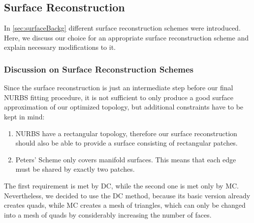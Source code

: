 \subsection{Surface Reconstruction}
\label{ssec:reconstruction}
In \autoref{sec:surfaceBackg} different surface reconstruction schemes were introduced. Here, we discuss our choice for an appropriate surface reconstruction scheme and explain necessary modifications to it.

\subsubsection{Discussion on Surface Reconstruction Schemes}
Since the surface reconstruction is just an intermediate step before our final \ac{NURBS} fitting procedure, it is not sufficient to only produce a good surface approximation of our optimized topology, but additional constraints have to be kept in mind:
\begin{enumerate}
\item \ac{NURBS} have a rectangular topology, therefore our surface reconstruction should also be able to provide a surface consisting of rectangular patches.
\item Peters' Scheme only covers manifold surfaces. This means that each edge must be shared by exactly two patches.
\end{enumerate}
The first requirement is met by \ac{DC}, while the second one is met only by \ac{MC}. Nevertheless, we decided to use the \ac{DC} method, because its basic version already creates \acp{quad}, while \ac{MC} creates a mesh of triangles, which can only be changed into a mesh of \acp{quad} by considerably increasing the number of faces.

